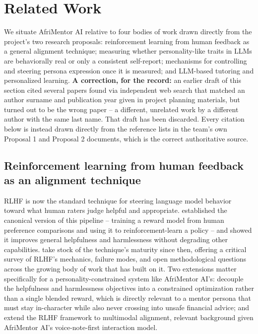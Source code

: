 \section{Related Work}
\label{sec:related-work}

We situate AfriMentor AI relative to four bodies of work drawn directly from the project's two research proposals: reinforcement learning from human feedback as a general alignment technique; measuring whether personality-like traits in LLMs are behaviorally real or only a consistent self-report; mechanisms for controlling and steering persona expression once it is measured; and LLM-based tutoring and personalized learning. \textbf{A correction, for the record:} an earlier draft of this section cited several papers found via independent web search that matched an author surname and publication year given in project planning materials, but turned out to be the wrong paper -- a different, unrelated work by a different author with the same last name. That draft has been discarded. Every citation below is instead drawn directly from the reference lists in the team's own Proposal 1 and Proposal 2 documents, which is the correct authoritative source.

\subsection{Reinforcement learning from human feedback as an alignment technique}

RLHF is now the standard technique for steering language model behavior toward what human raters judge helpful and appropriate. \citet{bai2022helpful} established the canonical version of this pipeline -- training a reward model from human preference comparisons and using it to reinforcement-learn a policy -- and showed it improves general helpfulness and harmlessness without degrading other capabilities. \citet{chaudhari2024rlhf} take stock of the technique's maturity since then, offering a critical survey of RLHF's mechanics, failure modes, and open methodological questions across the growing body of work that has built on it. Two extensions matter specifically for a personality-constrained system like AfriMentor AI's: \citet{dai2023saferlhf} decouple the helpfulness and harmlessness objectives into a constrained optimization rather than a single blended reward, which is directly relevant to a mentor persona that must stay in-character while also never crossing into unsafe financial advice; and \citet{zhang2025mmrlhf} extend the RLHF framework to multimodal alignment, relevant background given AfriMentor AI's voice-note-first interaction model.

